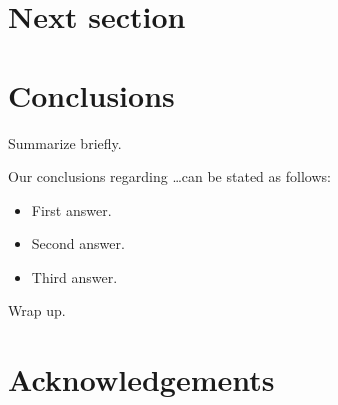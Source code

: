 \documentclass[useAMS,usenatbib]{mn2e}
\begin{document}

\section{Next section}
\label{sec:next}



\section{Conclusions}
\label{sec:conclude}

Summarize briefly.

Our conclusions regarding \ldots can be stated as follows:

\begin{itemize}

\item First answer.

\item Second answer.

\item Third answer.

\end{itemize}

Wrap up.



\section*{Acknowledgements}






\label{lastpage}
\bsp
\end{document}
